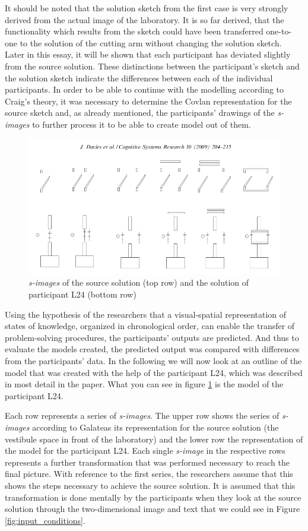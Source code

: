\documentclass[12pt]{article}
\begin{document}
It should be noted that the solution sketch from the first case is very strongly derived from the actual image of the laboratory. It is so far derived, that the functionality which results from the sketch could have been transferred one-to-one to the solution of the cutting arm without changing the solution sketch. Later in this essay, it will be shown that each participant has deviated slightly from the source solution. These distinctions between the participant's sketch and the solution sketch indicate the differences between each of the individual participants. In order to be able to continue with the modelling according to Craig's theory, it was necessary to determine the Covlan representation for the source sketch and, as already mentioned, the participants' drawings of the  \textit{s-images} to further process it to be able to create model out of them. 

\begin{figure}[H]
  \centering
  \includegraphics[width=0.7\linewidth]{images/covlan_L24.PNG}
  \caption{\label{fig:covlan_l24}\textit{s-images} of the source solution (top row) and the solution of participant L24 (bottom row)}
\end{figure}  

Using the hypothesis of the researchers that a visual-spatial representation of states of knowledge, organized in chronological order, can enable the transfer of problem-solving procedures, the participants' outputs are predicted. And thus to evaluate the models created, the predicted output was compared with differences from the participants' data. In the following we will now look at an outline of the model that was created with the help of the participant L24, which was described in most detail in the paper.  What you can see in figure \ref{fig:covlan_l24} is the model of the participant L24. 

Each row represents a series of \textit{s-images}. The upper row shows the series of \textit{s-images} according to Galateas its representation for the source solution (the vestibule space in front of the laboratory) and the lower row the representation of the model for the participant L24. Each single \textit{s-image} in the respective rows represents a further transformation that was performed necessary to reach the final picture. With reference to the first series, the researchers assume that this shows the steps necessary to achieve the source solution. It is assumed that this transformation is done mentally by the participants when they look at the source solution through the two-dimensional image and text that we could see in Figure \ref{fig:input_conditions}. 
\end{document}
